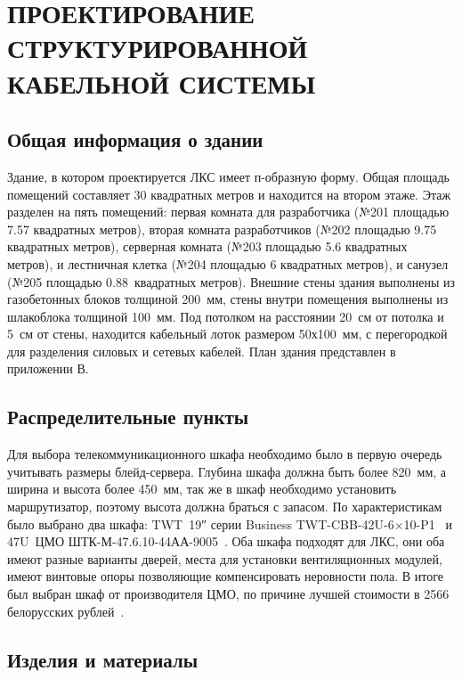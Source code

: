 \section{ПРОЕКТИРОВАНИЕ СТРУКТУРИРОВАННОЙ КАБЕЛЬНОЙ СИСТЕМЫ}
\label{sec:ckc}

\subsection{Общая информация о здании}

Здание, в котором проектируется ЛКС имеет п-образную форму. Общая площадь помещений составляет 30 квадратных метров и находится на втором этаже. Этаж разделен на пять помещений: первая комната для разработчика (№201 площадью 7.57 квадратных метров), вторая комната разработчиков (№202 площадью 9.75 квадратных метров), серверная комната (№203 площадью 5.6 квадратных метров), и лестничная клетка (№204 площадью 6 квадратных метров), и санузел (№205 площадью 0.88~квадратных метров). Внешние стены здания выполнены из газобетонных блоков толщиной 200~мм, стены внутри помещения выполнены из шлакоблока толщиной 100~мм. Под потолком на расстоянии 20~см от потолка и 5~см от стены, находится кабельный лоток размером 50х100~мм, с перегородкой для разделения силовых и сетевых кабелей. План здания представлен в приложении В.

\subsection{Распределительные пункты}

Для выбора телекоммуникационного шкафа необходимо было в первую очередь учитывать размеры блейд-сервера. Глубина шкафа должна быть более 820~мм, а ширина и высота более 450~мм, так же в шкаф необходимо установить маршрутизатор, поэтому высота должна браться с запасом. По характеристикам было выбрано два шкафа: TWT~19″ серии Business TWT-CBB-42U-6×10-P1~\cite{business_skaff} и 47U~ЦМО ШТК-М-47.6.10-44АА-9005~\cite{cmo_skaff}. Оба шкафа подходят для ЛКС, они оба имеют разные варианты дверей, места для установки вентиляционных модулей, имеют винтовые опоры позволяющие компенсировать неровности пола. В итоге был выбран шкаф от производителя ЦМО, по причине лучшей стоимости в 2566 белорусских рублей~\cite{cmo_skaff}.

\subsection{Изделия и материалы}

